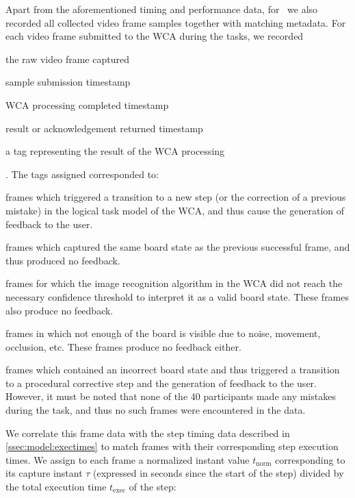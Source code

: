 Apart from the aforementioned timing and performance data, for~\cite{olguinmunoz:impact2021} we also recorded all collected video frame samples together with matching metadata.
For each video frame submitted to the \ac{WCA} during the tasks, we recorded
\begin{enumerate*}[itemjoin={{; }}, itemjoin*={{; and }}]
    \item the raw video frame captured
    \item sample submission timestamp
    \item \ac{WCA} processing completed timestamp
    \item result or acknowledgement returned timestamp
    \item a tag representing the result of the \ac{WCA} processing
\end{enumerate*}.
The tags assigned corresponded to:
\begin{description}[font={\bfseries\ttfamily}, wide]
    \item[SUCCESS:] frames which triggered a transition to a new step (or the correction of a previous mistake) in the logical task model of the \ac{WCA}, and thus cause the generation of feedback to the user.
    \item[REPEAT:] frames which captured the same board state as the previous successful frame, and thus produced no feedback.
    \item[LOW\_CONFIDENCE] frames for which the image recognition algorithm in the \ac{WCA} did not reach the necessary confidence threshold to interpret it as a valid board state.
        These frames also produce no feedback.
    \item[BLANK] frames in which not enough of the board is visible due to noise, movement, occlusion, etc.
        These frames produce no feedback either.
    \item[TASK\_ERROR] frames which contained an incorrect board state and thus triggered a transition to a procedural corrective step and the generation of feedback to the user.
        However, it must be noted that none of the \num{40} participants made any mistakes during the task, and thus no such frames were encountered in the data.
\end{description}

We correlate this frame data with the step timing data described in \cref{ssec:model:exectimes} to match frames with their corresponding step execution times.
We assign to each frame a normalized instant value \( t_\text{norm} \) corresponding to its capture instant \( \tau \) (expressed in seconds since the start of the step) divided by the total execution time \( t_\text{exec} \) of the step:

